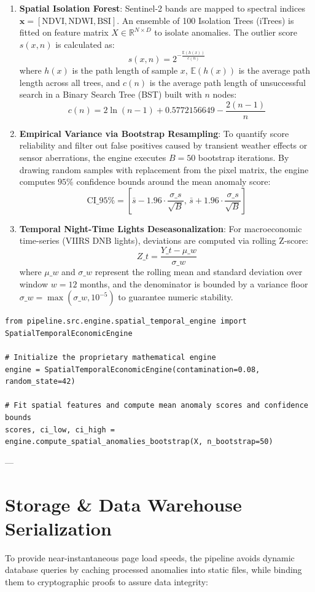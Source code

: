 \begin{enumerate}
  \item \textbf{Spatial Isolation Forest}: Sentinel-2 bands are mapped to spectral indices $\mathbf{x} = [\text{NDVI}, \text{NDWI}, \text{BSI}]$. An ensemble of 100 Isolation Trees (iTrees) is fitted on feature matrix $X \in \mathbb{R}^{N \times D}$ to isolate anomalies. The outlier score $s(x, n)$ is calculated as:
   $$s(x, n) = 2^{-\frac{\mathbb{E}(h(x))}{c(n)}}$$
   where $h(x)$ is the path length of sample $x$, $\mathbb{E}(h(x))$ is the average path length across all trees, and $c(n)$ is the average path length of unsuccessful search in a Binary Search Tree (BST) built with $n$ nodes:
   $$c(n) = 2 \ln(n - 1) + 0.5772156649 - \frac{2(n - 1)}{n}$$
  \item \textbf{Empirical Variance via Bootstrap Resampling}: To quantify score reliability and filter out false positives caused by transient weather effects or sensor aberrations, the engine executes $B = 50$ bootstrap iterations. By drawing random samples with replacement from the pixel matrix, the engine computes $95\%$ confidence bounds around the mean anomaly score:
   $$\text{CI}\_{95\%} = \left[ \bar{s} - 1.96 \cdot \frac{\sigma\_s}{\sqrt{B}}, \, \bar{s} + 1.96 \cdot \frac{\sigma\_s}{\sqrt{B}} \right]$$
  \item \textbf{Temporal Night-Time Lights Deseasonalization}: For macroeconomic time-series (VIIRS DNB lights), deviations are computed via rolling Z-score:
   $$Z\_t = \frac{Y\_t - \mu\_w}{\sigma\_w}$$
   where $\mu\_w$ and $\sigma\_w$ represent the rolling mean and standard deviation over window $w=12$ months, and the denominator is bounded by a variance floor $\sigma\_w = \max(\sigma\_w, 10^{-5})$ to guarantee numeric stability.

\end{enumerate}
\begin{verbatim}
from pipeline.src.engine.spatial_temporal_engine import SpatialTemporalEconomicEngine

# Initialize the proprietary mathematical engine
engine = SpatialTemporalEconomicEngine(contamination=0.08, random_state=42)

# Fit spatial features and compute mean anomaly scores and confidence bounds
scores, ci_low, ci_high = engine.compute_spatial_anomalies_bootstrap(X, n_bootstrap=50)
\end{verbatim}

---

\section{Storage \& Data Warehouse Serialization}
To provide near-instantaneous page load speeds, the pipeline avoids dynamic database queries by caching processed anomalies into static files, while binding them to cryptographic proofs to assure data integrity:

